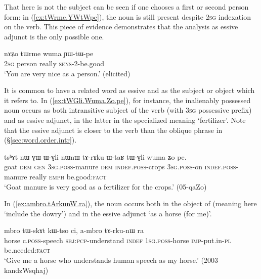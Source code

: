 That  here is not the subject can be seen if one chooses a first or second person form: in (\ref{ex:tWrme.YWtWpe}), the noun  is still present despite \textsc{2sg} indexation on the verb. This piece of evidence demonstrates that the analysis as essive adjunct is the only possible one.

\begin{exe}
\ex \label{ex:tWrme.YWtWpe}
\gll  nɤʑo tɯrme wuma ɲɯ-tɯ-pe \\
\textsc{2sg} person really \textsc{sens}-2-be.good \\
\glt `You are very nice as a person.'  (elicited)
\end{exe}


 
It is common to have a related word as essive and as the subject or object which it refers to. In (\ref{ex:tWGli.Wuma.Zo.pe}), for instance, the inalienably possessed noun  occurs as both intransitive subject of the verb  (with \textsc{3sg} possessive prefix) and as essive adjunct, in the latter in the specialized meaning `fertilizer'. Note that the essive adjunct is closer to the verb than the oblique phrase in  (§\ref{sec:word.order.intr}).

\begin{exe}
\ex \label{ex:tWGli.Wuma.Zo.pe}
\gll tsʰɤt nɯ ɣɯ ɯ-ɣli nɯnɯ tɤ-rɤku ɯ-taʁ tɯ-ɣli wuma ʑo pe. \\
goat \textsc{dem} \textsc{gen} \textsc{3sg}.\textsc{poss}-manure \textsc{dem} \textsc{indef}.\textsc{poss}-crops \textsc{3sg}.\textsc{poss}-on \textsc{indef}.\textsc{poss}-manure really \textsc{emph} be.good:\textsc{fact} \\
\glt `Goat manure is very good as a fertilizer for the crops.' (05-qaZo) 	
\end{exe}

 In (\ref{ex:ambro.tArkunW.ra}), the noun  occurs both in the object of  (meaning here `include the dowry') and in the essive adjunct   `as a horse (for me)'.

\begin{exe}
\ex \label{ex:ambro.tArkunW.ra}
\gll mbro tɯ-skɤt kɯ-tso ci, a-mbro tɤ-rku-nɯ ra \\
horse c.\textsc{poss}-speech \textsc{sbj}:\textsc{pcp}-understand \textsc{indef} \textsc{1sg}.\textsc{poss}-horse \textsc{imp}-put.in-\textsc{pl} be.needed:\textsc{fact} \\
\glt `Give me a horse who understands human speech as my horse.'  (2003 kandzWsqhaj)
\end{exe}

